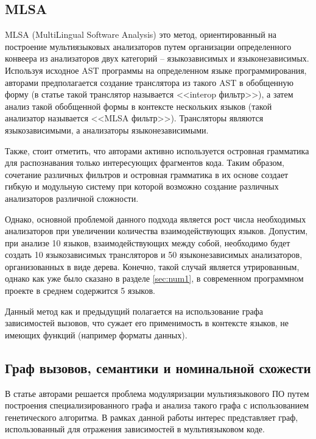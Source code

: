 \subsection{MLSA} \label{ssec:mlsa}

MLSA (MultiLingual Software Analysis) \cite{MLSA} это метод, ориентированный на построение мультиязыковых анализаторов
путем организации определенного конвеера из анализаторов двух категорий -- языкозависимых и языконезависимых.
Используя исходное AST программы на определенном языке программирования, авторами предполагается
создание транслятора из такого AST в обобщенную форму (в статье такой транслятор называется <<interop фильтр>>),
а затем анализ такой обобщенной формы в контексте нескольких языков (такой анализатор называется <<MLSA фильтр>>).
Трансляторы являются языкозависимыми, а анализаторы языконезависимыми.

Также, стоит отметить, что авторами активно используется островная грамматика \cite{island-grammars} для
распознавания только интересующих фрагментов кода. Таким образом, сочетание различных фильтров и островная грамматика
в их основе создает гибкую и модульную систему при которой возможно создание различных анализаторов различной сложности.

Однако, основной проблемой данного подхода является рост числа необходимых анализаторов при увеличении
количества взаимодействующих языков. Допустим, при анализе 10 языков, взаимодействующих между собой, необходимо
будет создать 10 языкозависимых трансляторов и 50 языконезависимых анализаторов, организованных в виде
дерева. Конечно, такой случай является утрированным, однако как уже было сказано в разделе \ref{sec:num1}, в современном
программном проекте в среднем содержится 5 языков.

Данный метод как и предыдущий полагается на использование графа зависимостей вызовов, что сужает его применимость
в контексте языков, не имеющих функций (например форматы данных).

\subsection{Граф вызовов, семантики и номинальной схожести} \label{ssec:graphs}

В статье \cite{SNDGA} авторами решается проблема модуляризации мультиязыкового ПО путем построения специализированного графа
и анализа такого графа с использованием генетического алгоритма. В рамках данной работы интерес представляет
граф, использованный для отражения зависимостей в мультиязыковом коде.

